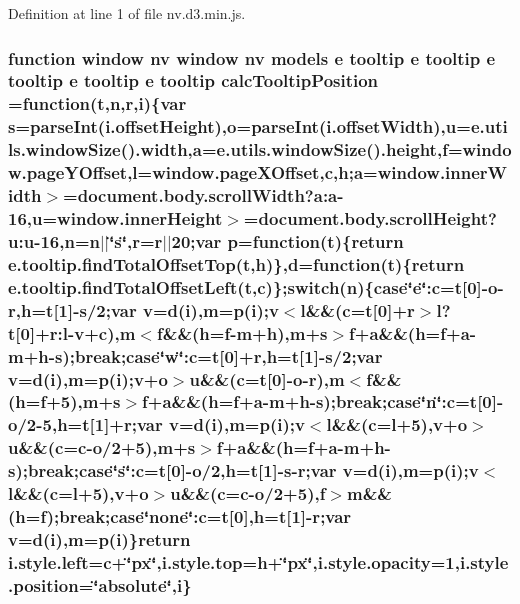 Definition at line 1 of file nv.\+d3.\+min.\+js.

\subsubsection[{calc\+Tooltip\+Position}]{\setlength{\rightskip}{0pt plus 5cm}function {\bf window} {\bf nv} {\bf window} {\bf nv} {\bf models} {\bf e} {\bf tooltip} {\bf e} {\bf tooltip} {\bf e} {\bf tooltip} {\bf e} {\bf tooltip} {\bf e} {\bf tooltip} calc\+Tooltip\+Position =function(t,{\bf n},{\bf r},{\bf i})\{var s=parse\+Int(i.\+offset\+Height),{\bf o}=parse\+Int(i.\+offset\+Width),u=e.\+utils.\+window\+Size().width,{\bf a}=e.\+utils.\+window\+Size().height,{\bf f}=window.\+page\+Y\+Offset,l=window.\+page\+X\+Offset,{\bf c},h;{\bf a}=window.\+inner\+Width$>$=document.\+body.\+scroll\+Width?a\+:a-\/16,u=window.\+inner\+Height$>$=document.\+body.\+scroll\+Height?u\+:u-\/16,{\bf n}={\bf n}$\vert$$\vert$\char`\"{}s\char`\"{},r={\bf r}$\vert$$\vert$20;var p=function(t)\{{\bf return} {\bf e.\+tooltip.\+find\+Total\+Offset\+Top}(t,h)\},{\bf d}=function(t)\{{\bf return} {\bf e.\+tooltip.\+find\+Total\+Offset\+Left}(t,{\bf c})\};switch({\bf n})\{case\char`\"{}e\char`\"{}\+:c=t[0]-\/{\bf o}-\/{\bf r},h=t[1]-\/s/2;var v={\bf d}({\bf i}),m=p({\bf i});v$<$l\&\&({\bf c}=t[0]+{\bf r}$>$l?t[0]+r\+:l-\/v+{\bf c}),m$<${\bf f}\&\&(h={\bf f}-\/m+h),m+s$>${\bf f}+{\bf a}\&\&(h={\bf f}+{\bf a}-\/m+h-\/s);break;case\char`\"{}w\char`\"{}\+:c=t[0]+{\bf r},h=t[1]-\/s/2;var v={\bf d}({\bf i}),m=p({\bf i});v+{\bf o}$>$u\&\&({\bf c}=t[0]-\/{\bf o}-\/{\bf r}),m$<${\bf f}\&\&(h={\bf f}+5),m+s$>${\bf f}+{\bf a}\&\&(h={\bf f}+{\bf a}-\/m+h-\/s);break;case\char`\"{}n\char`\"{}\+:c=t[0]-\/{\bf o}/2-\/5,h=t[1]+{\bf r};var v={\bf d}({\bf i}),m=p({\bf i});v$<$l\&\&({\bf c}=l+5),v+{\bf o}$>$u\&\&({\bf c}={\bf c}-\/{\bf o}/2+5),m+s$>${\bf f}+{\bf a}\&\&(h={\bf f}+{\bf a}-\/m+h-\/s);break;case\char`\"{}s\char`\"{}\+:c=t[0]-\/{\bf o}/2,h=t[1]-\/s-\/{\bf r};var v={\bf d}({\bf i}),m=p({\bf i});v$<$l\&\&({\bf c}=l+5),v+{\bf o}$>$u\&\&({\bf c}={\bf c}-\/{\bf o}/2+5),{\bf f}$>$m\&\&(h={\bf f});break;case\char`\"{}none\char`\"{}\+:c=t[0],h=t[1]-\/{\bf r};var v={\bf d}({\bf i}),m=p({\bf i})\}{\bf return} i.\+style.\+left={\bf c}+\char`\"{}px\char`\"{},i.\+style.\+top=h+\char`\"{}px\char`\"{},i.\+style.\+opacity=1,i.\+style.\+position=\char`\"{}absolute\char`\"{},i\}}\label{nv_8d3_8min_8js_a580871d258b35d3fbb8b72afaae664f5}


